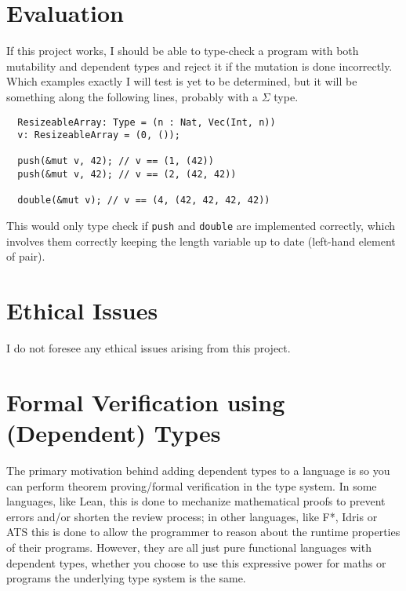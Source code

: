 \documentclass[12pt,twoside]{report}
\begin{document}
\chapter{Evaluation}


If this project works, I should be able to type-check a program with both mutability and dependent types and reject it if the mutation is done incorrectly. Which examples exactly I will test is yet to be determined, but it will be something along the following lines, probably with a $\Sigma$ type.

\begin{lstlisting}
  ResizeableArray: Type = (n : Nat, Vec(Int, n))
  v: ResizeableArray = (0, ());

  push(&mut v, 42); // v == (1, (42))
  push(&mut v, 42); // v == (2, (42, 42))

  double(&mut v); // v == (4, (42, 42, 42, 42))
\end{lstlisting}

This would only type check if \verb|push| and \verb|double| are implemented correctly, which involves them correctly keeping the length variable up to date (left-hand element of pair).

\chapter{Ethical Issues}
I do not foresee any ethical issues arising from this project.




\appendix 
{}

\chapter{Formal Verification using (Dependent) Types}
\label{verificationwithtypes}

The primary motivation behind adding dependent types to a language is so you can perform theorem proving/formal verification in the type system. In some languages, like Lean, this is done to mechanize mathematical proofs to prevent errors and/or shorten the review process; in other languages, like F*, Idris or ATS this is done to allow the programmer to reason about the runtime properties of their programs. However, they are all just pure functional languages with dependent types, whether you choose to use this expressive power for maths or programs the underlying type system is the same.
\end{document}
